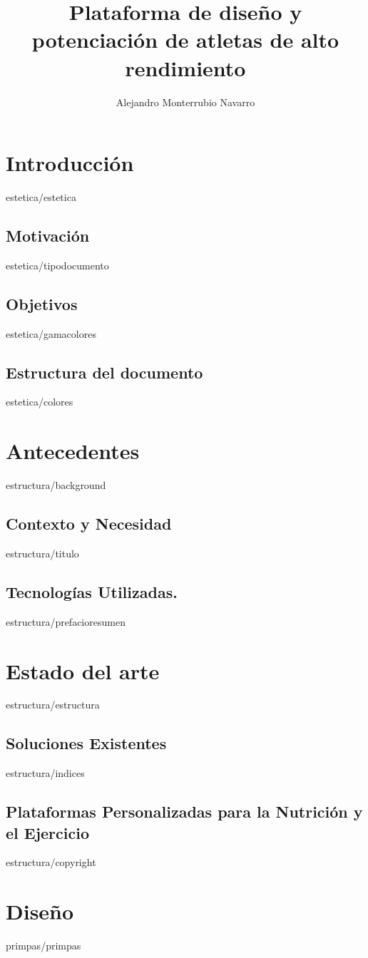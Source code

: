 \documentclass[epsbased,copyright,final,printable,covers,extendedindex,firstnumbered,tfg,gnuplot]{tfgtfmthesisuam}
\title{Plataforma de diseño y potenciación de atletas de alto rendimiento}
\author{Alejandro Monterrubio Navarro}
\begin{document}
\chapter{Introducción\label{CAP:ESTETICA}}{estetica/estetica}
  \section{Motivación\label{SEC:TIPODOC}}{estetica/tipodocumento}
  \section{Objetivos\label{SEC:GAMASEL}}{estetica/gamacolores}
  \section{Estructura del documento\label{SEC:COLORES}}{estetica/colores}

\chapter{Antecedentes\label{CAP:BACKGROUND}}{estructura/background}
  \section{Contexto y Necesidad\label{SEC:VARIABLES}}{estructura/titulo}
  \section{Tecnologías Utilizadas.\label{SEC:PREFACIO}}{estructura/prefacioresumen}

\chapter{Estado del arte\label{CAP:ESTRUCTURA}}{estructura/estructura}
  \section{Soluciones Existentes\label{SEC:INDICES}}{estructura/indices}
  \section{Plataformas Personalizadas para la Nutrición y el Ejercicio\label{SEC:COPYRIGHT}}{estructura/copyright}

\chapter{Diseño\label{CAP:PRIMEROSPASOS}}{primpas/primpas}
\end{document}
